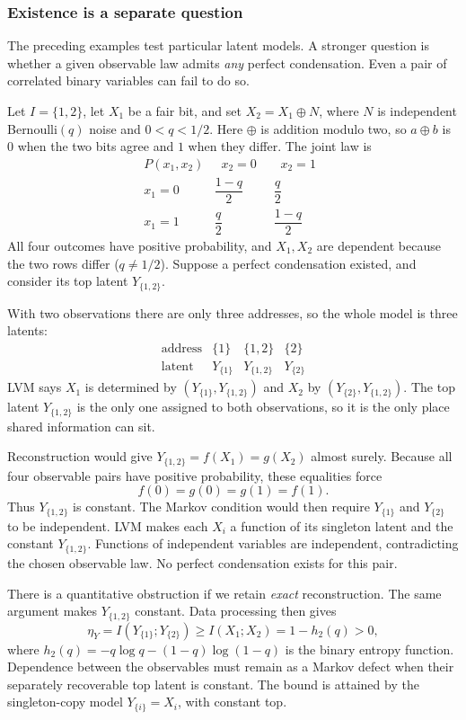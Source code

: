 \documentclass[11pt]{article}
\begin{document}
\subsubsection{Existence is a separate question}
\label{sec:existence}
The preceding examples test particular latent models. A stronger question is
whether a given observable law admits \emph{any} perfect condensation.
Even a pair of correlated binary variables can fail to do so.

Let $I=\{1,2\}$, let $X_1$ be a fair bit, and set $X_2=X_1\mathbin{\oplus}N$,
where $N$ is independent Bernoulli$(q)$ noise and $0<q<1/2$. Here
$\oplus$ is addition modulo two, so $a\oplus b$ is $0$ when the two bits agree
and $1$ when they differ.
The joint law is
\[
\renewcommand{\arraystretch}{1.8}
\begin{array}{r|cc}
 P(x_1,x_2) & \;\;x_2=0\;\; & \;\;x_2=1\;\;\\\hline
 x_1=0 & \dfrac{1-q}{2} & \dfrac{q}{2}\\
 x_1=1 & \dfrac{q}{2} & \dfrac{1-q}{2}
\end{array}
\]
All four outcomes have positive probability, and $X_1,X_2$ are dependent
because the two rows differ ($q\ne1/2$).
Suppose a perfect condensation existed, and consider its top latent
$Y_{\{1,2\}}$.

With two observations there are only three addresses, so the whole model is
three latents:
\[
\begin{array}{r|ccc}
 \text{address} & \{1\} & \{1,2\} & \{2\}\\
 \text{latent} & Y_{\{1\}} & Y_{\{1,2\}} & Y_{\{2\}}
\end{array}
\]
LVM says $X_1$ is determined by $(Y_{\{1\}},Y_{\{1,2\}})$ and $X_2$ by
$(Y_{\{2\}},Y_{\{1,2\}})$. The top latent $Y_{\{1,2\}}$ is the only one assigned to both
observations, so it is the only place shared information can sit.

Reconstruction would give $Y_{\{1,2\}}=f(X_1)=g(X_2)$ almost surely. Because
all four observable pairs have positive probability, these equalities force
\[
 f(0)=g(0)=g(1)=f(1).
\]
Thus $Y_{\{1,2\}}$ is constant. The Markov condition would then require
$Y_{\{1\}}$ and $Y_{\{2\}}$ to be independent. LVM
makes each $X_i$ a function of its singleton latent and the constant $Y_{\{1,2\}}$.
Functions of independent variables are independent, contradicting the chosen
observable law. No perfect condensation exists for this pair.

There is a quantitative obstruction if we retain \emph{exact} reconstruction. The same argument makes $Y_{\{1,2\}}$ constant. Data processing then
gives
\[
 \eta_Y=I(Y_{\{1\}};Y_{\{2\}})
 \ge I(X_1;X_2)=1-h_2(q)>0,
\]
where $h_2(q)=-q\log q-(1-q)\log(1-q)$ is the binary entropy function.
Dependence between the observables must remain as a Markov defect when their
separately recoverable top latent is constant. The bound is attained by the
singleton-copy model $Y_{\{i\}}=X_i$, with constant top.
\end{document}
